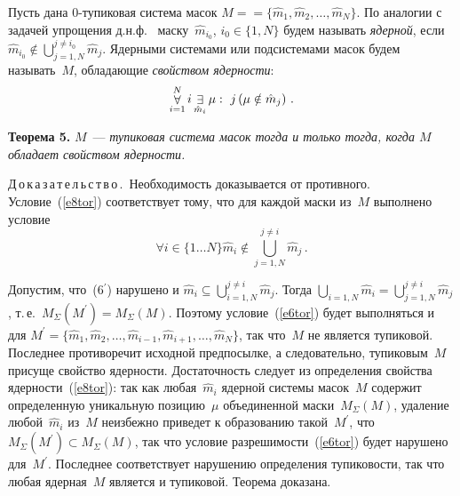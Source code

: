 \begin{multicols}{2}
{}

    Пусть дана 0-тупиковая система масок $M =$\linebreak $= \{\hat{m}_1, \hat{m}_2, \ldots 
, \hat{m}_N\}$. По аналогии с задачей упрощения д.н.ф.~\cite{15tor} 
маску~$\hat{m}_{i_0}$, $i_0\in \{1,N\}$ будем называть \textit{ядерной}, если 
$\hat{m}_{i_0} \notin \bigcup\limits_{j=1,N}^{j\not= i_0} \hat{m}_j$. Ядерными 
системами или подсистемами масок будем называть~$M$, обладающие 
\textit{свойством ядерности}:
\begin{equation}
\mathop{\forall}\limits_{i=1}^N i \mathop{\exists}\limits_{\hat{m}_i} \mu:\ j \left(\mu\notin 
\hat{m}_j\right)\,.
\label{e8tor}
\end{equation}

\noindent
\textbf{Теорема 5.} $M$~--- \textit{тупиковая система масок тогда и только 
тогда, когда $M$ обладает свойством ядер\-ности.} 

\pagebreak

\noindent
Д\,о\,к\,а\,з\,а\,т\,е\,л\,ь\,с\,т\,в\,о\,.\  Необходимость доказывается от 
противного. Условие~(\ref{e8tor}) соответствует тому, что для каждой маски 
из~$M$ выполнено условие
\setcounter{equation}{5}\renewcommand{\theequation}{\arabic{equation}$^\prime$}
\begin{equation}
\forall i\in  \{ 1\ldots N\} \hat{m}_i\notin \bigcup\limits_{j=1,N}^{j\not= i} \hat{m}_j\,.
\end{equation}
\renewcommand{\theequation}{\arabic{equation}}


\noindent
Допустим, что~(6$^\prime$) нарушено и $\hat{m}_i\subseteq 
\bigcup\limits_{i=1,N}^{j\not= i} \hat{m}_j$. Тогда $\bigcup\limits_{i=1,N} \hat{m}_i 
=\bigcup\limits_{j=1,N}^{j\not= i} \hat{m}_j$, т.\,е.\ $M_\Sigma (M^\prime) 
=M_\Sigma(M)$. Поэтому условие~(\ref{e6tor}) будет выполняться и для 
$M^\prime = \{ \hat{m}_1, \hat{m}_2, \ldots , \hat{m}_{i-1}, \hat{m}_{i+1}, \ldots 
, \hat{m}_N\}$, так что~$M$ не является тупиковой. Последнее противоречит\linebreak 
исходной предпосылке, а следовательно, тупиковым~$M$ присуще свойство 
ядер\-ности. Достаточность следует из определения свойства 
ядер\-ности~(\ref{e8tor}): так как любая~$\hat{m}_i$ ядерной системы\linebreak 
масок~$M$ содержит определенную уникальную позицию~$\mu$ 
объединенной маски~$M_\Sigma(M)$, удаление любой~$\hat{m}_i$ из~$M$ 
неизбежно приведет к образованию такой~$M^\prime$, что $M_\Sigma 
(M^\prime )\subset M_\Sigma(M)$, так что условие разрешимости~(\ref{e6tor}) 
будет нарушено для~$M^\prime$. Последнее соответствует нарушению 
определения тупиковости, так что любая  ядерная~$M$ является и тупиковой. 
Теорема доказана. 


\end{multicols}
